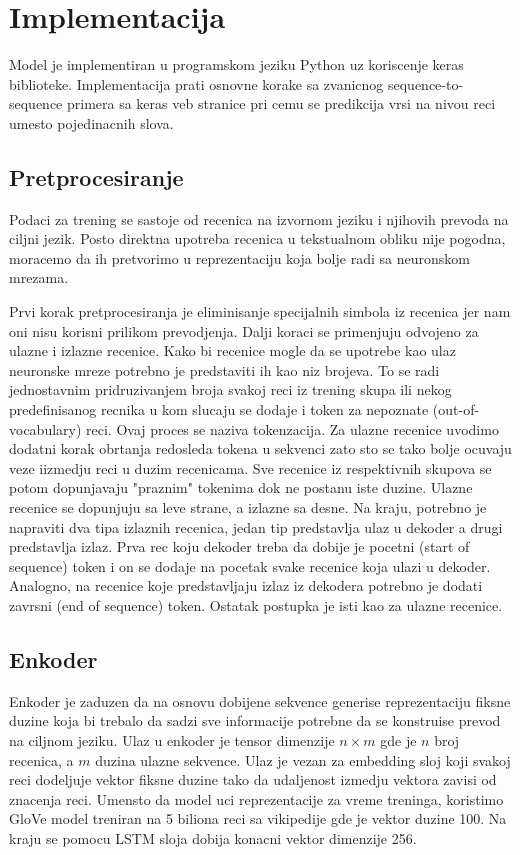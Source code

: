 \documentclass[a4paper]{article}
\begin{document}
\section{Implementacija}

Model je implementiran u programskom jeziku Python uz koriscenje keras biblioteke. Implementacija prati osnovne korake sa zvanicnog sequence-to-sequence primera sa keras veb stranice \cite{} pri cemu se predikcija vrsi na nivou reci umesto pojedinacnih slova.

\subsection{Pretprocesiranje}
Podaci za trening se sastoje od recenica na izvornom jeziku i njihovih prevoda na ciljni jezik. Posto direktna upotreba recenica u tekstualnom obliku nije pogodna, moracemo da ih pretvorimo u reprezentaciju koja bolje radi sa neuronskom mrezama.

Prvi korak pretprocesiranja je eliminisanje specijalnih simbola iz recenica jer nam oni nisu korisni prilikom prevodjenja.
Dalji koraci se primenjuju odvojeno za ulazne i izlazne recenice.
Kako bi recenice mogle da se upotrebe kao ulaz neuronske mreze potrebno je predstaviti ih kao niz brojeva. To se radi jednostavnim pridruzivanjem broja svakoj reci iz trening skupa ili nekog predefinisanog recnika u kom slucaju se dodaje i token za nepoznate (out-of-vocabulary) reci. Ovaj proces se naziva tokenzacija.
Za ulazne recenice uvodimo dodatni korak obrtanja redosleda tokena u sekvenci zato sto se tako bolje ocuvaju veze iizmedju reci u duzim recenicama.
Sve recenice iz respektivnih skupova se potom dopunjavaju "praznim" tokenima dok ne postanu iste duzine. Ulazne recenice se dopunjuju sa leve strane, a izlazne sa desne.
Na kraju, potrebno je napraviti dva tipa izlaznih recenica, jedan tip predstavlja ulaz u dekoder a drugi predstavlja izlaz. Prva rec koju dekoder treba da dobije je pocetni (start of sequence) token i on se dodaje na pocetak svake recenice koja ulazi u dekoder. Analogno, na recenice koje predstavljaju izlaz iz dekodera potrebno je dodati zavrsni (end of sequence) token. Ostatak postupka je isti kao za ulazne recenice.

\subsection{Enkoder}
Enkoder je zaduzen da na osnovu dobijene sekvence generise reprezentaciju fiksne duzine koja bi trebalo da sadzi sve informacije potrebne da se konstruise prevod na ciljnom jeziku. Ulaz u enkoder je tensor dimenzije $n \times m$ gde je $n$ broj recenica, a $m$ duzina ulazne sekvence. Ulaz je vezan za embedding sloj koji svakoj reci dodeljuje vektor fiksne duzine tako da udaljenost izmedju vektora zavisi od znacenja reci. Umensto da model uci reprezentacije za vreme treninga, koristimo GloVe \cite{} model treniran na 5 biliona reci sa vikipedije gde je vektor duzine 100. Na kraju se pomocu LSTM sloja dobija konacni vektor dimenzije 256.
\end{document}
